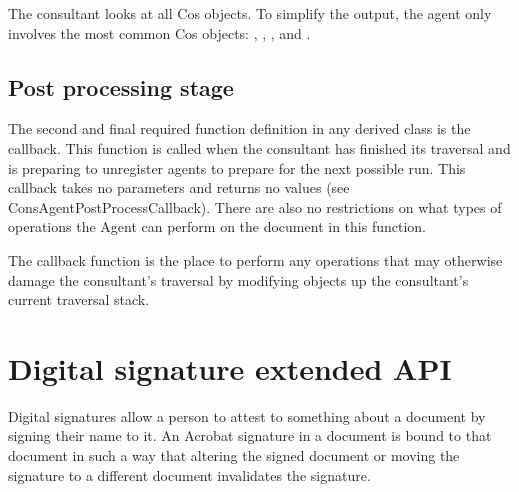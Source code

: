 \documentclass[letterpaper,12pt,english,openany,oneside]{sphinxmanual}
\begin{document}
\begin{sphinxVerbatim}[commandchars=\\\{\}]
       \PYG{p}{[}\PYG{p}{]}
 \PYG{p}{[}\PYG{p}{]}
\end{sphinxVerbatim}

The consultant looks at all Cos objects. To simplify the output, the  agent only involves the most common Cos objects: , , , and .


\subsection{Post processing stage}
\label{\detokenize{Plugins_ExtendedAPI:post-processing-stage}}
The second and final required function definition in any  derived class is the  callback. This function is called when the consultant has finished its traversal and is preparing to unregister agents to prepare for the next possible run. This callback takes no parameters and returns no values (see ConsAgentPostProcessCallback). There are also no restrictions on what types of operations the Agent can perform on the document in this function.

The  callback function is the place to perform any operations that may otherwise damage the consultant’s traversal by modifying objects up the consultant’s current traversal stack.


\section{Digital signature extended API}
\label{\detokenize{Plugins_ExtendedAPI:digital-signature-extended-api}}
Digital signatures allow a person to attest to something about a document by signing their name to it. An Acrobat signature in a document is bound to that document in such a way that altering the signed document or moving the signature to a different document invalidates the signature.
\end{document}
